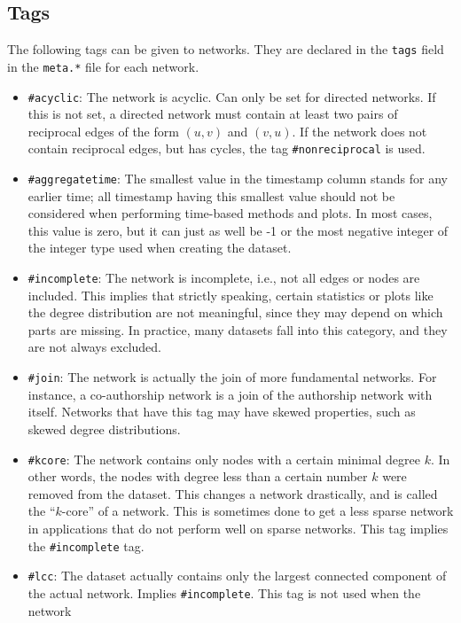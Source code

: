 \documentclass{article}
\begin{document}
\subsection{Tags}
\label{sec:tags}
The following tags can be given to networks.  They are declared in the
\texttt{tags} field in the \texttt{meta.*} file for each network. 
\begin{itemize}
\item \texttt{\#acyclic}:  The network is acyclic.  Can only be
  set for directed networks.  If this is not set, a directed
  network must contain at least two pairs of reciprocal edges of
  the form $(u,v)$ and $(v,u)$.  If the network does not contain
  reciprocal edges, but has cycles, the tag
  \texttt{\#nonreciprocal} is used.
\item \texttt{\#aggregatetime}:  The smallest value in the timestamp column
  stands for any earlier time; all timestamp having this smallest value should not be
  considered when performing time-based methods and plots.  In most
  cases, this value is zero, but it can just as well be -1 or the most
  negative integer of the integer type used when creating the dataset. 
\item \texttt{\#incomplete}: The network is incomplete, i.e.,
  not all edges or nodes are included.  This implies that
  strictly speaking, certain statistics or plots like 
  the degree distribution are not meaningful, since they may
  depend on which parts are missing.  In practice, many datasets
  fall into this category, and they are not always excluded. 
\item \texttt{\#join}:  The network is actually the join of more
  fundamental networks.  For instance, a co-authorship network
  is a join of the authorship network with itself.  Networks
  that have this tag may have skewed properties, such as skewed
  degree distributions.
\item \texttt{\#kcore}: The network contains only nodes with a
  certain minimal degree $k$. In other words, the nodes with
  degree less than a certain number $k$ were removed from the
  dataset.  This changes a network drastically, and is called
  the ``$k$-core'' of a network. This is sometimes done to get
  a less sparse network in applications that do not perform well
  on sparse networks. This tag implies the
  \texttt{\#incomplete} tag.
\item \texttt{\#lcc}:  The dataset actually contains only the
  largest connected component of the actual network.  Implies
  \texttt{\#incomplete}.  This tag is not used when the network

\end{itemize}
\end{document}
